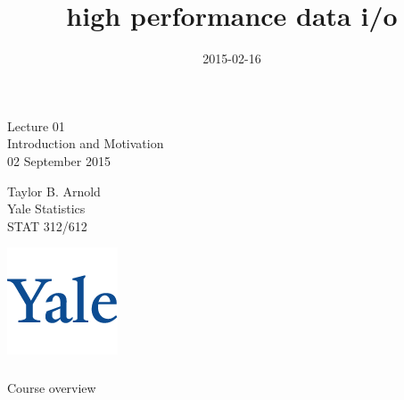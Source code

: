 

\title{high performance data i/o}
\date{2015-02-16}



\begin{frame}[fragile] \frametitle{}

\vfill

{\fontsize{0.7cm}{0cm}\selectfont Lecture 01 \\\vspace{0.2cm} Introduction and Motivation}\\\vspace{0.5cm}
02 September 2015

\vspace{2cm}

\begin{minipage}{0.6\textwidth}
Taylor B. Arnold \\
Yale Statistics \\
STAT 312/612
\end{minipage}
\hfill
\begin{minipage}{0.3\textwidth}\raggedleft
\includegraphics[scale=0.3]{../yale-logo.png}
\end{minipage}%

\end{frame}

\begin{frame}[fragile] \frametitle{}

\begin{flushright}
{\color{yaleblue}\sc\fontsize{1cm}{0cm}\selectfont Course overview}
\end{flushright}


\end{frame}




